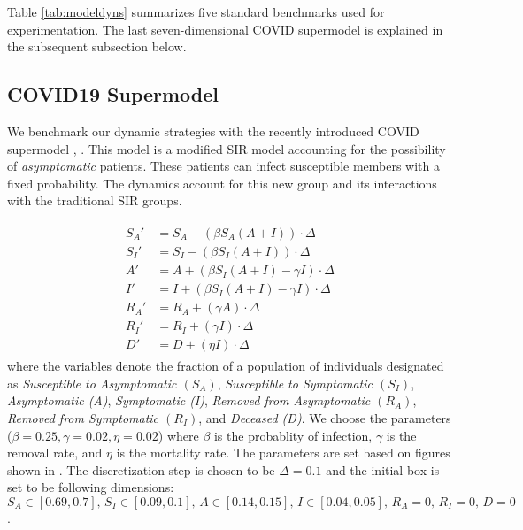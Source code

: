 Table \ref{tab:modeldyns} summarizes five standard benchmarks used for experimentation. The last seven-dimensional COVID supermodel is explained in the subsequent subsection below.

\subsection{COVID19 Supermodel}
\label{sec:covid}
We benchmark our dynamic strategies with the recently introduced COVID supermodel \cite{ansumali2020modelling}, \cite{indiansuper2020supermodel}. This model is a modified SIR model accounting for the possibility of \emph{asymptomatic} patients. These patients can infect susceptible members with a fixed probability. The dynamics account for this new group and its interactions with the traditional SIR groups.

\begin{align}
  \begin{split}
   S_A' & = S_A  -(\beta S_A(A+I))\cdot \Delta \\
   S_I' & = S_I  -(\beta S_I (A + I))\cdot \Delta \\
   A' & = A + (\beta S_I(A+I) - \gamma I)\cdot \Delta \\
   I' & = I + (\beta S_I (A+I) - \gamma I)\cdot  \Delta \\
   R_A' & = R_A + (\gamma A)\cdot \Delta \\
   R_I' & = R_I + (\gamma I)\cdot \Delta \\
   D' & = D + (\eta I)\cdot \Delta
  \end{split}
\end{align}
where the variables denote the fraction of a population of individuals designated as \emph{Susceptible to Asymptomatic $(S_A)$}, \emph{Susceptible to Symptomatic $(S_I)$}, \emph{Asymptomatic (A)}, \emph{Symptomatic (I)}, \emph{Removed from Asymptomatic $(R_A)$}, \emph{Removed from Symptomatic $(R_I)$}, and \emph{Deceased (D)}. We choose the parameters ($\beta = 0.25, \gamma=0.02, \eta=0.02$) where $\beta$ is the probablity of infection, $\gamma$ is the removal rate, and $\eta$ is the mortality rate. The parameters are set based on figures shown in \cite{ansumali2020modelling}. The discretization step is chosen to be $\Delta = 0.1$ and the initial box is set to be following dimensions: $S_A  \in [0.69, 0.7], \, S_I \in [0.09, 0.1], \, A \in [0.14, 0.15], \, I \in [0.04, 0.05], \, R_A  = 0,\, R_I  = 0, \, D  = 0$.

